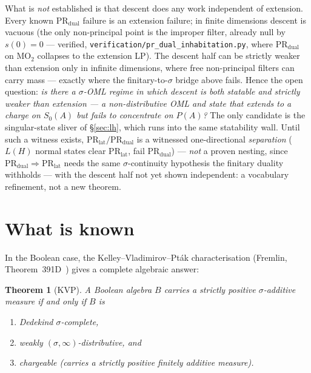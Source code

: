 \documentclass[11pt]{article}
\newtheorem{theorem}{Theorem}[section]
\theoremstyle{definition}
\begin{document}
What is \emph{not} established is that descent does any work independent
of extension.  Every known $\text{PR}_{\text{dual}}$ failure is an
extension failure; in finite dimensions descent is vacuous (the only
non-principal point is the improper filter, already null by $s(0)=0$ ---
verified, \texttt{verification/pr\_dual\_inhabitation.py}, where
$\text{PR}_{\text{dual}}$ on $\mathrm{MO}_2$ collapses to the extension
LP).  The descent half can be strictly weaker than extension only in
infinite dimensions, where free non-principal filters can carry mass ---
exactly where the finitary-to-$\sigma$ bridge above fails.  Hence the
open question: \emph{is there a $\sigma$-OML regime in which descent is
both statable and strictly weaker than extension --- a non-distributive
OML and state that extends to a charge on $S_0(A)$ but fails to
concentrate on $P(A)$?}  The only candidate is the singular-state sliver
of \S\ref{sec:lh}, which runs into the same statability wall.  Until such
a witness exists, $\text{PR}_{\text{lat}}/\text{PR}_{\text{dual}}$ is a
witnessed one-directional \emph{separation} ($L(H)$ normal states clear
$\text{PR}_{\text{lat}}$, fail $\text{PR}_{\text{dual}}$) --- \emph{not} a
proven nesting, since $\text{PR}_{\text{dual}} \Rightarrow
\text{PR}_{\text{lat}}$ needs the same $\sigma$-continuity hypothesis the
finitary duality withholds --- with the descent half not yet shown
independent: a vocabulary refinement, not a new theorem.

\section{What is known}
\label{sec:known}

In the Boolean case, the Kelley--Vladimirov--Pt\'{a}k
characterisation (Fremlin,
Theorem~391D~\cite{Fremlin3}) gives a complete algebraic answer:

\begin{theorem}[KVP]\label{thm:kvp}
A Boolean algebra $B$ carries a strictly positive
$\sigma$-additive measure if and only if $B$ is
\begin{enumerate}[label=(\alph*), noitemsep]
  \item Dedekind $\sigma$-complete,
  \item weakly $(\sigma,\infty)$-distributive, and
  \item chargeable (carries a strictly positive finitely additive
    measure).
\end{enumerate}
\end{theorem}
\end{document}
